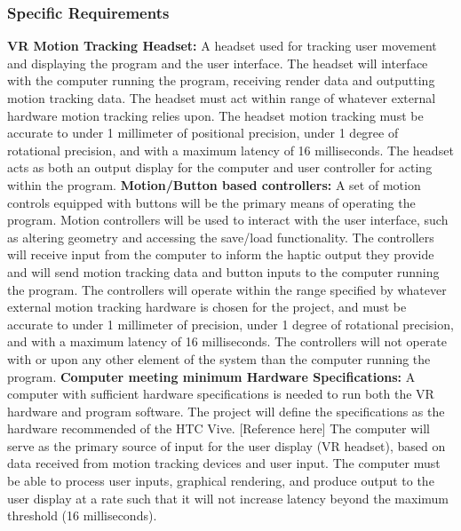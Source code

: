 \documentclass[onecolumn, draftclsnofoot,10pt, compsoc]{IEEEtran}
\newcounter{threesection}[subsubsection]
\newcounter{foursection}[threesection]
\begin{document}
\subsubsection{Specific Requirements}
\textbf{VR Motion Tracking Headset:}
\newline
A headset used for tracking user movement and displaying the program and the user interface.
The headset will interface with the computer running the program, receiving render data and outputting motion tracking data.
The headset must act within range of whatever external hardware motion tracking relies upon.
The headset motion tracking must be accurate to under 1 millimeter of positional precision, under 1 degree of rotational precision, and with a maximum latency of 16 milliseconds.
The headset acts as both an output display for the computer and user controller for acting within the program. 
\newline
\textbf{Motion/Button based controllers:}
\newline
A set of motion controls equipped with buttons will be the primary means of operating the program.
Motion controllers will be used to interact with the user interface, such as altering geometry and accessing the save/load functionality. 
The controllers will receive input from the computer to inform the haptic output they provide and will send motion tracking data and button inputs to the computer running the program.
The controllers will operate within the range specified by whatever external motion tracking hardware is chosen for the project, and must be accurate to under 1 millimeter of precision, under 1 degree of rotational precision, and with a maximum latency of 16 milliseconds.
The controllers will not operate with or upon any other element of the system than the computer running the program.
\textbf{Computer meeting minimum Hardware Specifications:}
A computer with sufficient hardware specifications is needed to run both the VR hardware and program software.
The project will define the specifications as the hardware recommended of the HTC Vive.
[Reference here] The computer will serve as the primary source of input for the user display (VR headset), based on data received from motion tracking devices and user input.
The computer must be able to process user inputs, graphical rendering, and produce output to the user display at a rate such that it will not increase latency beyond the maximum threshold (16 milliseconds).
\end{document}

